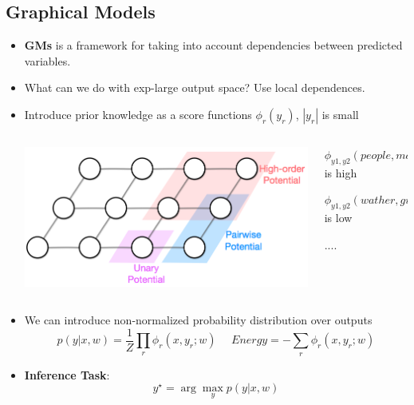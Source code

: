 \documentclass{beamer}
\begin{document}
\subsection*{Graphical Models}
\begin{frame}
	\begin{itemize}
		\item \textbf{GMs} is a framework for taking into account dependencies between predicted variables.
		\item What can we do with exp-large output space? Use local dependences.
		\item Introduce prior knowledge as a score functions $\phi_r(y_r)$, $|y_r|$ is small
			\begin{columns}[onlytextwidth]
				\begin{column}{0.5\textwidth}
					\begin{center}
						\includegraphics[scale=0.18]{img/gm}
					\end{center}
				\end{column}
				\begin{column}{0.50\textwidth}
					$\phi_{y1, y2}(people, male) = 10$ is high 
					
					$\phi_{y1, y2}(wather, girl) = 0.2$ is low			
					
					....
				\end{column}
			\end{columns}
			
		\item We can introduce non-normalized probability distribution over outputs
			$$p(y|x, w) = \frac{1}{Z} \prod_r \phi_r(x, y_r; w)~~~~~~Energy = - \sum_r \phi_r(x, y_r; w)$$
		
		\item \textbf{Inference Task}: 
			$$y^\star = \arg\max_y p(y|x, w)$$
	\end{itemize}
\end{frame}
\end{document}
